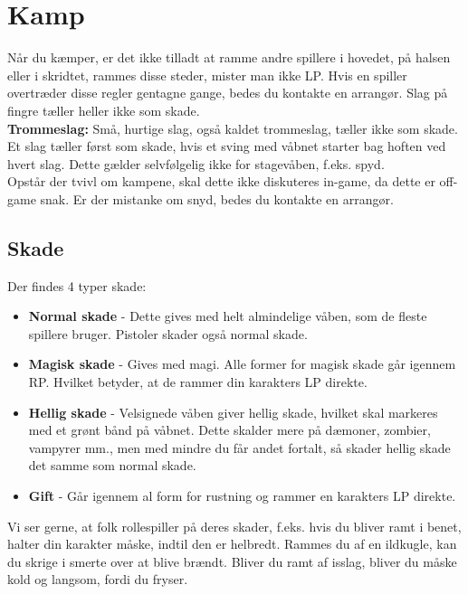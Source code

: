 \section{Kamp}
Når du kæmper, er det ikke tilladt at ramme andre spillere i hovedet, på halsen eller i skridtet, rammes disse steder, mister man ikke LP. Hvis en spiller overtræder disse regler gentagne gange, bedes du kontakte en arrangør. Slag på fingre tæller heller ikke som skade.\\
\textbf{Trommeslag:} Små, hurtige slag, også kaldet trommeslag, tæller ikke som skade. Et slag tæller først som skade, hvis et sving med våbnet starter bag hoften ved hvert slag. Dette gælder selvfølgelig ikke for stagevåben, f.eks. spyd.\\
Opstår der tvivl om kampene, skal dette ikke diskuteres in-game, da dette er off-game snak. Er der mistanke om snyd, bedes du kontakte en arrangør.
\subsection{Skade}
Der findes 4 typer skade:
\begin{itemize}
    \item \textbf{Normal skade} - Dette gives med helt almindelige våben, som de fleste spillere bruger. Pistoler skader også normal skade.
    \item \textbf{Magisk skade} - Gives med magi. Alle former for magisk skade går igennem RP. Hvilket betyder, at de rammer din karakters LP direkte.
    \item \textbf{Hellig skade} - Velsignede våben giver hellig skade, hvilket skal markeres med et grønt bånd på våbnet. Dette skalder mere på dæmoner, zombier, vampyrer mm., men med mindre du får andet fortalt, så skader hellig skade det samme som normal skade.
    \item \textbf{Gift} - Går igennem al form for rustning og rammer en karakters LP direkte.
\end{itemize}
Vi ser gerne, at folk rollespiller på deres skader, f.eks. hvis du bliver ramt i benet, halter din karakter måske, indtil den er helbredt. Rammes du af en ildkugle, kan du skrige i smerte over at blive brændt. Bliver du ramt af isslag, bliver du måske kold og langsom, fordi du fryser.

